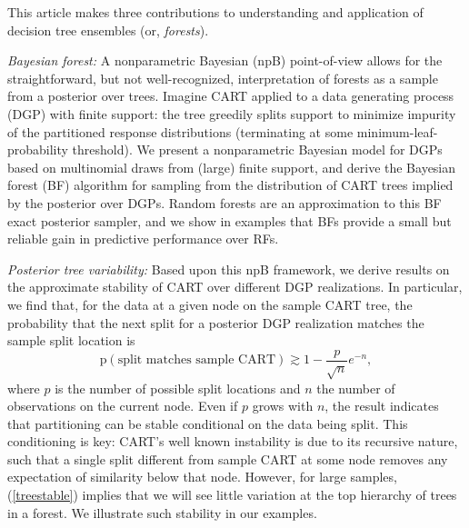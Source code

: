 \documentclass{article}
\begin{document}
This article makes three contributions to understanding and application of
decision tree ensembles (or, \textit{forests}).


\textit{Bayesian forest:}  A nonparametric Bayesian (npB) point-of-view
allows for the straightforward, but not well-recognized, interpretation of
forests as a sample from a posterior over trees. Imagine CART applied to a
data generating process (DGP) with finite support: the tree greedily splits
support to minimize impurity of the partitioned response distributions
(terminating at some minimum-leaf-probability threshold). We present a
nonparametric Bayesian model for DGPs based on multinomial draws from
(large) finite support, and derive the Bayesian forest (BF) algorithm for
sampling from the distribution of CART trees implied by the posterior over
DGPs.  Random forests are an approximation to this BF exact posterior sampler,
and we show in examples that BFs provide a small but reliable gain in
predictive performance over RFs.

\textit{Posterior tree variability:} Based upon this npB framework, we derive
results on the approximate stability of CART  over different DGP realizations.
In particular, we find that, for the data at a given node on the
sample CART tree, the probability that the next split for a posterior
DGP realization  matches the sample split location is
\begin{equation}\label{treestable}
\mathrm{p}\left(\text{split matches sample CART}\right) \gtrsim 1 - \frac{p}{\sqrt{n}} e^{-n},
\end{equation}
where $p$ is the number of possible split locations and $n$ the number of observations on the current node.  Even if $p$ grows with $n$, the result indicates that partitioning can be stable conditional on the data being split.  This conditioning is key: CART's well known instability is due to its recursive nature, such that a single split different from sample CART at some node removes any expectation of similarity  below that node.  However, for  large samples, (\ref{treestable}) implies that we will see little variation at the top hierarchy of  trees in a forest.  We illustrate such stability in our examples.
\end{document}
